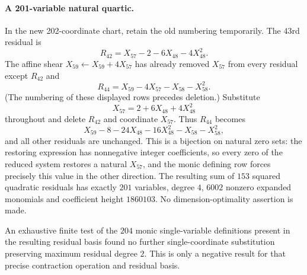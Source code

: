 \paragraph{A 201-variable natural quartic.}
In the new 202-coordinate chart, retain the old numbering temporarily.
The $43$rd residual is
\[
 R_{42}=X_{57}-2-6X_{48}-4X_{48}^2.
\]
The affine shear $X_{59}\leftarrow X_{59}+4X_{57}$ has already removed
$X_{57}$ from every residual except $R_{42}$ and
\[
 R_{44}=X_{59}-4X_{57}-X_{58}-X_{58}^2.
\]
(The numbering of these displayed rows precedes deletion.)  Substitute
\[
 X_{57}=2+6X_{48}+4X_{48}^2
\]
throughout and delete $R_{42}$ and coordinate $X_{57}$.  Thus $R_{44}$ becomes
\[
 X_{59}-8-24X_{48}-16X_{48}^2-X_{58}-X_{58}^2,
\]
and all other residuals are unchanged.  This is a bijection on natural zero
sets: the restoring expression has nonnegative integer coefficients, so
every zero of the reduced system restores a natural $X_{57}$, and the monic
defining row forces precisely this value in the other direction.  The
resulting sum of $153$ squared quadratic residuals has exactly $201$
variables, degree $4$, $6002$ nonzero expanded monomials and coefficient
height $1860103$.  No dimension-optimality assertion is made.

An exhaustive finite test of the $204$ monic single-variable definitions
present in the resulting residual basis found no further single-coordinate
substitution preserving maximum residual degree $2$.  This is only a
negative result for that precise contraction operation and residual basis.
